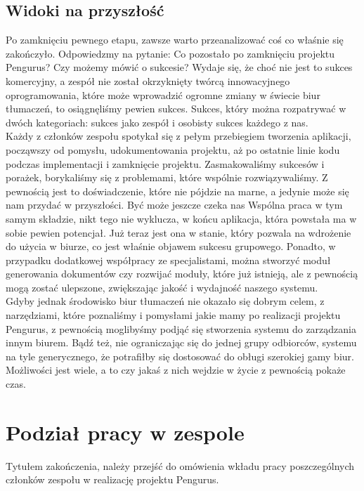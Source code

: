 \documentclass[licencjacka]{pracamgr}
\begin{document}
\section{Widoki na przyszłość}
Po zamknięciu pewnego etapu, zawsze warto przeanalizować coś co właśnie się zakończyło. Odpowiedzmy na pytanie: Co pozostało po zamknięciu projektu Pengurus?
Czy możemy mówić o sukcesie? Wydaje się, że choć nie jest to sukces komercyjny, a zespół nie został okrzyknięty twórcą innowacyjnego oprogramowania, 
które może wprowadzić ogromne zmiany w świecie biur tłumaczeń, to osiągnęliśmy pewien sukces. Sukces, który można rozpatrywać 
w dwóch kategoriach: sukces jako zespół i osobisty sukces każdego z nas. \\

Każdy z członków zespołu spotykał się z pełym przebiegiem tworzenia aplikacji, począwszy od pomysłu, udokumentowania projektu, aż po ostatnie linie kodu 
podczas implementacji i zamknięcie projektu. Zasmakowaliśmy sukcesów i porażek, borykaliśmy się z problemami, które wspólnie rozwiązywaliśmy. Z pewnością 
jest to doświadczenie, które nie pójdzie na marne, a jedynie może się nam przydać w przyszłości. Być może jeszcze czeka nas Wspólna praca w tym samym składzie,
nikt tego nie wyklucza, w końcu aplikacja, która powstała ma w sobie pewien potencjał. Już teraz jest ona w stanie, 
który pozwala na wdrożenie do użycia w biurze, co jest właśnie objawem sukcesu grupowego. Ponadto, w przypadku dodatkowej współpracy ze specjalistami, 
można stworzyć moduł generowania dokumentów czy rozwijać moduły, które już istnieją, ale z pewnością mogą zostać ulepszone, 
zwiększając jakość i wydajność naszego systemu. \\

Gdyby jednak środowisko biur tłumaczeń nie okazało się dobrym celem, z narzędziami, które poznaliśmy i pomysłami jakie mamy po realizacji projektu Pengurus, 
z pewnością moglibyśmy podjąć się stworzenia systemu do zarządzania innym biurem. Bądź też, nie ograniczając się do jednej grupy odbiorców, 
systemu na tyle generycznego, że potrafiłby się dostosować do obługi szerokiej gamy biur. 
Możliwości jest wiele, a to czy jakaś z nich wejdzie w życie z pewnością pokaże czas.

\chapter{Podział pracy w zespole}
Tytułem zakończenia, należy przejść do omówienia wkładu pracy poszczególnych członków zespołu w realizację projektu Pengurus.
\end{document}
